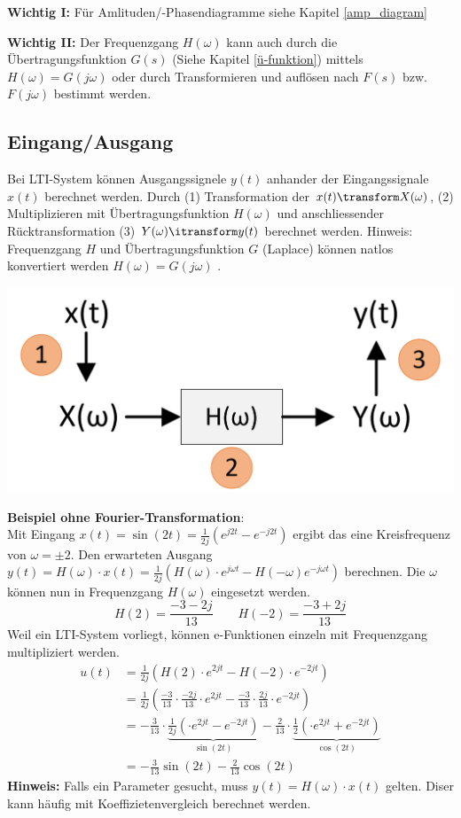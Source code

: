 \textbf{Wichtig I:} Für Amlituden/-Phasendiagramme siehe Kapitel \ref{amp_diagram}

\textbf{Wichtig II:} Der Frequenzgang $H(\omega)$ kann auch durch die Übertragungsfunktion $G(s)$ (Siehe Kapitel \ref{ü-funktion}) mittels $H(\omega) = G(j\omega)$ oder durch Transformieren und auflösen nach $F(s)$ bzw. $F(j\omega)$ bestimmt werden. \\

\subsection{Eingang/Ausgang}
Bei LTI-System können Ausgangssignele $y(t)$ anhander der Eingangssignale $x(t)$ berechnet werden. Durch (1) Transformation der $x(t) \transform X(\omega)$, (2) Multiplizieren mit Übertragungsfunktion $H(\omega)$ und anschliessender Rücktransformation (3) $Y(\omega) \itransform y(t)$ berechnet werden. Hinweis: Frequenzgang $H$ und Übertragungsfunktion $G$ (Laplace) können natlos konvertiert werden  $H(\omega) = G(j\omega)$ .
\begin{center}
	\includegraphics[width=0.5\columnwidth]{Images/eingang_ausgang}
\end{center}

\noindent\textbf{Beispiel ohne Fourier-Transformation}:\\
\noindent Mit Eingang $x(t) = \sin(2t) = \frac{1}{2j}\left(e^{j2t} - e^{-j2t}\right)$ ergibt das eine Kreisfrequenz von $\omega = \pm2$. Den erwarteten Ausgang $y(t) = H(\omega)\cdot x(t) = \frac{1}{2j}\left(H(\omega)\cdot e^{j\omega t} - H(-\omega)e^{-j\omega t}\right)$ berechnen. Die $\omega$ können nun in Frequenzgang $H(\omega)$ eingesetzt werden.
\[
H(2) = \frac{-3 -2j}{13}\qquad H(-2)= \frac{-3 + 2j}{13}
\]
Weil ein LTI-System vorliegt, können e-Funktionen einzeln mit Frequenzgang multipliziert werden.
\begin{align*}
	u(t) &= \frac{1}{2j}\left(H(2)\cdot e^{2jt} - H(-2)\cdot e^{-2jt}\right) \\
	&= \frac{1}{2j}\left(\frac{-3}{13}\cdot\frac{-2j}{13}\cdot e^{2jt} - \frac{-3}{13}\cdot\frac{2j}{13}\cdot e^{-2jt} \right) \\
	&= -\frac{3}{13}\cdot \underbrace{\frac{1}{2j}\left(\cdot e^{2jt} - e^{-2jt} \right)}_{\sin(2t)} - \frac{2}{13}\cdot \underbrace{\frac{1}{2}\left(\cdot e^{2jt} + e^{-2jt}\right)}_{\cos(2t)}  \\
	&= -\frac{3}{13}\sin(2t) - \frac{2}{13}\cos(2t)
\end{align*} 
\textbf{Hinweis:} Falls ein Parameter gesucht, muss $y(t) = H(\omega)\cdot x(t)$ gelten. Diser kann häufig mit Koeffizietenvergleich berechnet werden.


